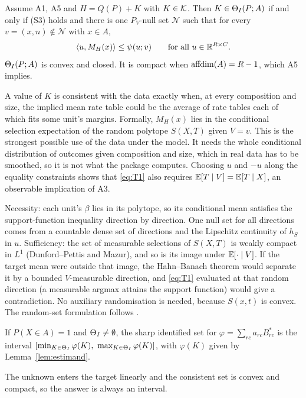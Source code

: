 \begin{theorem}\label{thm:sharp}
Assume A1, A5 and $H=Q(P)+K$ with $K\in\mathcal K$. Then $K\in\Theta_I(P;A)$ if and
only if (S3) holds and there is one $P_V$-null set $\mathcal N$ such that for
every $v=(x,n)\notin\mathcal N$ with $x\in A$,
\begin{equation}\label{eq:T1}
\langle u,M_H(x)\rangle\le\psi(u;v)\qquad\text{for all }u\in\mathbb R^{R\times C}.
\end{equation}
$\Theta_I(P;A)$ is convex and closed. It is compact when $\operatorname{affdim}(A)=R-1$, which A5
implies.
\end{theorem}
\begin{reading}
A value of $K$ is consistent with the data exactly when, at every composition and
size, the implied mean rate table could be the average of rate tables each of
which fits some unit's margins. Formally, $M_H(x)$ lies in the conditional
selection expectation of the random polytope $S(X,T)$ given $V=v$. This is the
strongest possible use of the data under the model. It needs the whole
conditional distribution of outcomes given composition and size, which in real
data has to be smoothed, so it is not what the package computes. Choosing $u$
and $-u$ along the equality constraints shows that \eqref{eq:T1} also requires
$\mathbb E[T\mid V]=\mathbb E[T\mid X]$, an observable implication of A3.
\end{reading}
\begin{sketch}
Necessity: each unit's $\beta$ lies in its polytope, so its conditional mean
satisfies the support-function inequality direction by direction. One null set
for all directions comes from a countable dense set of directions and the
Lipschitz continuity of $h_S$ in $u$. Sufficiency: the set of measurable
selections of $S(X,T)$ is weakly compact in $L^1$ (Dunford--Pettis and Mazur),
and so is its image under $\mathbb E[\cdot\mid V]$. If the target mean were outside that
image, the Hahn--Banach theorem would separate it by a bounded $V$-measurable
direction, and \eqref{eq:T1} evaluated at that random direction (a measurable
argmax attains the support function) would give a contradiction. No auxiliary
randomisation is needed, because $S(x,t)$ is convex. The random-set
formulation follows \citet{bmm2011}.
\end{sketch}

\begin{corollary}\label{cor:sharp}
If $P(X\in A)=1$ and $\Theta_I\neq\emptyset$, the sharp identified set for
$\varphi=\sum_{rc}a_{rc}B^*_{rc}$ is the interval
$[\min_{K\in\ThI}\varphi(K),\ \max_{K\in\ThI}\varphi(K)]$, with $\varphi(K)$ given
by Lemma~\ref{lem:estimand}.
\end{corollary}
\begin{reading}
The unknown enters the target linearly and the consistent set is convex and
compact, so the answer is always an interval.
\end{reading}


